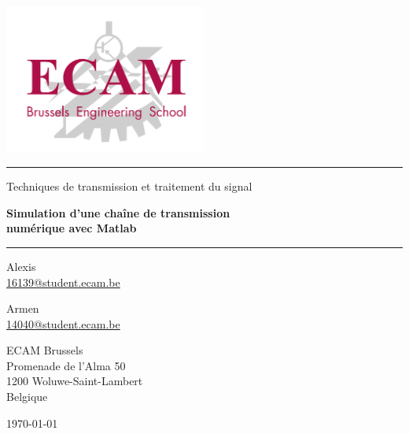 \documentclass[10pt, oneside, a4paper]{article}
\begin{document}
\begin{titlepage}
    \centering
    \includegraphics[width=0.5\textwidth]{images/logo-ecam.png}\par
    \vspace{1cm}

    \rule{\linewidth}{1.5pt}%
    \vspace{5mm}
    {\rm\sffamily\LARGE Techniques de transmission et traitement du signal\par}
    \vspace{3mm}
    {\sffamily\bfseries\LARGE Simulation d’une chaîne de transmission\\
    						  numérique avec Matlab\par}
    \vspace{5mm}
    \rule{\linewidth}{1.5pt}%
    \vspace{1cm}

    {\large%
        \begin{minipage}[t]{0.35\linewidth}
            \centering
            Alexis~ \\[1mm]
            \href{mailto:16139@student.ecam.be}{16139@student.ecam.be}
        \end{minipage}
        \begin{minipage}[t]{0.35\linewidth}
            \centering
            Armen~ \\[1mm]
            \href{mailto:14040@student.ecam.be}{14040@student.ecam.be}
        \end{minipage}
    \par}
    \vspace{1cm}

    {\large%
        ECAM Brussels             \\[1mm]
        Promenade de l'Alma 50    \\[1mm]
        1200 Woluwe-Saint-Lambert \\[1mm]
        Belgique
    \par}

    \vfill
    {\large\today\par}
\end{titlepage}
\end{document}
